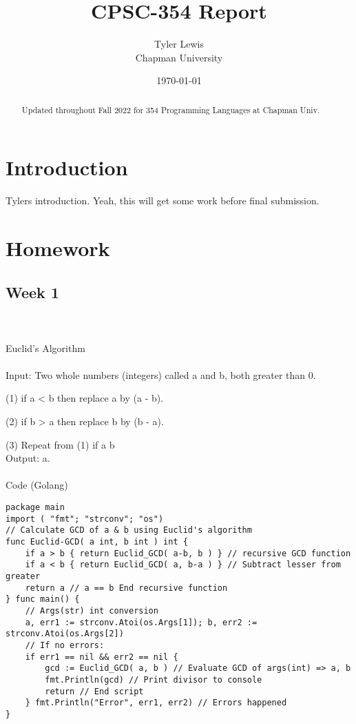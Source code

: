\documentclass{article}
\title{CPSC-354 Report}
\author{Tyler Lewis  \\ Chapman University}
\date{\today}
\theoremstyle{theorem}
\theoremstyle{definition}
\theoremstyle{remark}
\begin{document}
\setlength\parindent{24pt}

\maketitle

\begin{abstract}
Updated throughout Fall 2022 for 354 Programming Languages at Chapman Univ.
\end{abstract}

\tableofcontents

\section{Introduction}\label{intro}

Tylers introduction. Yeah, this will get some work before final submission. 


\section{Homework}\label{homework}

\subsection{Week 1}

{\large \\\\Euclid's Algorithm\\\\}
Input: Two whole numbers (integers) called a and b, both greater than 0.

(1) if a {\textless} b then replace a by (a - b). 

(2) if b {\textgreater} a then replace b by (b - a).

(3) Repeat from (1) if a {\neq} b \\ 

Output: a.\\\\

{\large Code (Golang)}
\begin{lstlisting}
package main
import ( "fmt"; "strconv"; "os")
// Calculate GCD of a & b using Euclid's algorithm
func Euclid-GCD( a int, b int ) int {
    if a > b { return Euclid_GCD( a-b, b ) } // recursive GCD function
    if a < b { return Euclid_GCD( a, b-a ) } // Subtract lesser from greater
	return a // a == b End recursive function
} func main() {
    // Args(str) int conversion 
	a, err1 := strconv.Atoi(os.Args[1]); b, err2 := strconv.Atoi(os.Args[2])
    // If no errors:
	if err1 == nil && err2 == nil {
		gcd := Euclid_GCD( a, b ) // Evaluate GCD of args(int) => a, b
		fmt.Println(gcd) // Print divisor to console
		return // End script
    } fmt.Println("Error", err1, err2) // Errors happened
}
\end{lstlisting}
\end{document}
